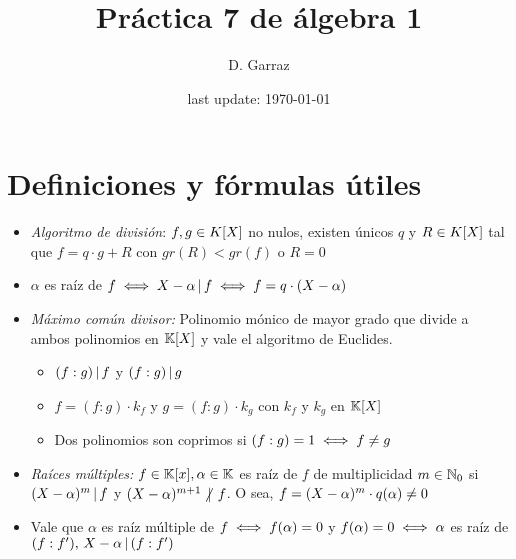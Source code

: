\documentclass[12pt,a4paper, spanish]{article}
\begin{document}

\pagestyle{empty} %

\title{Práctica 7 de álgebra 1} %
\author{D. Garraz} %
\date{last update: \today} %

\maketitle  %

\section{Definiciones y fórmulas útiles}
\begin{itemize}
	\item \textit{Algoritmo de división}: $f,g \in K[X]$ no nulos, existen únicos $q$ y $R \in K[X]$ tal que $f = q\cdot g + R$
	      con $gr(R) < gr(f)$ o $R = 0$

	\item $\alpha$ es raíz de $f \iff X - \alpha \, | \, f \iff f = q \cdot ( X - \alpha)$

	\item \textit{Máximo común divisor: } Polinomio mónico de mayor grado que divide a ambos polinomios en $\mathbb K[X]$
	      y vale el algoritmo de Euclides.
	      \begin{itemize}
		      \item $(f:g) \, | \, f$ y $(f:g) \, | \, g$

		      \item $f = (f:g)\cdot k_f$ y $g = (f:g)\cdot k_g$ con $k_f$ y $k_g$ en $\mathbb K[X]$

		      \item Dos polinomios son coprimos si $(f:g) = 1 \iff f \neq g$
	      \end{itemize}

	\item \textit{Raíces múltiples: } $f \in \mathbb K[x], \alpha \in \mathbb K$ es raíz de $f$ de multiplicidad
	      $m \in \mathbb N_0$ si $(X - \alpha)^m \, | \, f$ y $(X - \alpha)^{m+1} \noDivide f$.
	      O sea, $f = (X - \alpha)^m \cdot q(\alpha) \neq 0$

	\item Vale que $\alpha$ es raíz múltiple de $f \iff f(\alpha) = 0$ y $f(\alpha) = 0 \iff \alpha$ es raíz de $(f:f'),\, X - \alpha \, | \, (f:f')$

\end{itemize}
\end{document}
